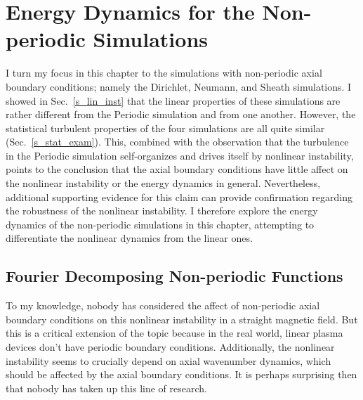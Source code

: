 \chapter{Energy Dynamics for the Non-periodic Simulations}
\label{c_nlin_nonper}

I turn my focus in this chapter to the simulations with non-periodic axial boundary conditions; namely the Dirichlet, Neumann, and Sheath simulations. I showed in Sec.~\ref{s_lin_inst}
that the linear properties of these simulations are rather different from the Periodic simulation and from one another. However, the statistical turbulent properties of the four simulations
are all quite similar (Sec.~\ref{s_stat_exam}). This, combined with the observation that the turbulence in the Periodic simulation self-organizes and drives itself by
nonlinear instability, points to the conclusion that the axial boundary conditions have little affect on the nonlinear instability or the energy dynamics in general. 
Nevertheless, additional supporting evidence for this claim can provide confirmation regarding the robustness of the nonlinear instability. I therefore explore the energy dynamics of the
non-periodic simulations in this chapter, attempting to differentiate the nonlinear dynamics from the linear ones.


\section{Fourier Decomposing Non-periodic Functions}
\label{s_fourier_decomp}

To my knowledge, nobody has considered the affect of non-periodic axial boundary conditions on this nonlinear instability in a straight magnetic field. But this is a critical extension of the topic
because in the real world, linear plasma devices don't have periodic boundary conditions. Additionally, the nonlinear instability seems to crucially depend on axial wavenumber dynamics, which should
be affected by the axial boundary conditions. It is perhaps surprising then that nobody has taken up this line of research.

